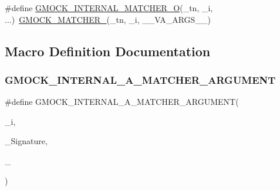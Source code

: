\begin{DoxyCompactItemize}
\item 
\#define \mbox{\hyperlink{googletest-master_2googlemock_2include_2gmock_2gmock-function-mocker_8h_a7f910424bb402247dfcba313bea0eda5}{G\+M\+O\+C\+K\+\_\+\+I\+N\+T\+E\+R\+N\+A\+L\+\_\+\+M\+A\+T\+C\+H\+E\+R\+\_\+O}}(\+\_\+tn,  \+\_\+i, ...)~\mbox{\hyperlink{_obj__test_2lib_2googletest-release-1_88_81_2googlemock_2include_2gmock_2gmock-generated-function-mockers_8h_aa87d0009fe91f1c89d658776b55a769c}{G\+M\+O\+C\+K\+\_\+\+M\+A\+T\+C\+H\+E\+R\+\_\+}}(\+\_\+tn, \+\_\+i, \+\_\+\+\_\+\+V\+A\+\_\+\+A\+R\+G\+S\+\_\+\+\_\+)
\end{DoxyCompactItemize}


\subsection{Macro Definition Documentation}
\mbox{\label{googletest-master_2googlemock_2include_2gmock_2gmock-function-mocker_8h_ab124145546366f2495dc81c5ba3ed541}} 
\subsubsection{\texorpdfstring{GMOCK\_INTERNAL\_A\_MATCHER\_ARGUMENT}{GMOCK\_INTERNAL\_A\_MATCHER\_ARGUMENT}}
{\footnotesize\ttfamily \#define G\+M\+O\+C\+K\+\_\+\+I\+N\+T\+E\+R\+N\+A\+L\+\_\+\+A\+\_\+\+M\+A\+T\+C\+H\+E\+R\+\_\+\+A\+R\+G\+U\+M\+E\+NT(\begin{DoxyParamCaption}\item[{}]{\+\_\+i,  }\item[{}]{\+\_\+\+Signature,  }\item[{}]{\+\_\+ }\end{DoxyParamCaption})}

